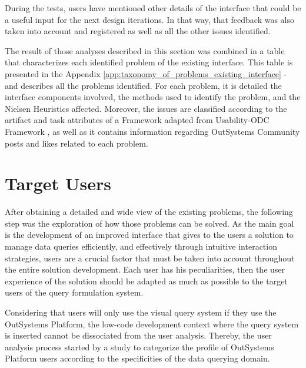 
During the tests, users have mentioned other details of the interface that could be a useful input for the next design iterations. In that way, that feedback was also taken into account and registered as well as all the other issues identified. 

The result of those analyses described in this section was combined in a table that characterizes each identified problem of the existing interface. This table is presented in the Appendix \ref{app:taxonomy_of_problems_existing_interface} -  and describes all the problems identified. For each problem, it is detailed the interface components involved, the methods used to identify the problem, and the Nielsen Heuristics \cite{nielsen_heuristics} affected. Moreover, the issues are classified according to the artifact and task attributes of a Framework adapted from Usability-ODC Framework \cite{in_process_usability_problem_classification_analysis_improvement}, as well as it contains information regarding OutSystems Community\cite{outsystems_community} posts and likes related to each problem.

\section{Target Users}
\label{sec:target_users}

After obtaining a detailed and wide view of the existing problems, the following step was the exploration of how those problems can be solved. As the main goal is the development of an improved interface that gives to the users a solution to manage data queries efficiently, and effectively through intuitive interaction strategies, users are a crucial factor that must be taken into account throughout the entire solution development. Each user has his peculiarities, then the user experience of the solution should be adapted as much as possible to the target users of the query formulation system.

Considering that users will only use the visual query system if they use the OutSystems Platform, the low-code development context where the query system is inserted cannot be dissociated from the user analysis. Thereby, the user analysis process started by a study to categorize the profile of OutSystems Platform users according to the specificities of the data querying domain.

